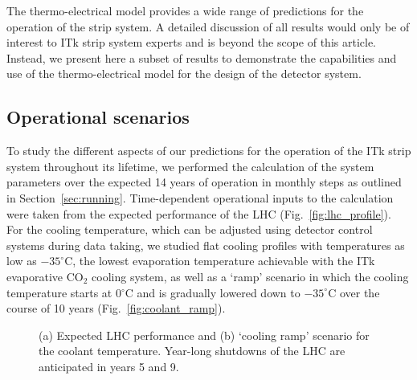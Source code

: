 
The thermo-electrical model provides a wide range of predictions for the operation of the strip system. A detailed discussion of all results would only be of interest to ITk strip system experts and is beyond the scope of this article. Instead, we present here a subset of results to demonstrate the capabilities and use of the thermo-electrical model for the design of the detector system.

\subsection{Operational scenarios}\label{sec:opscenarios}
To study the different aspects of our predictions for the operation of the ITk strip system throughout its lifetime, we performed the calculation of the system parameters over the expected 14 years of operation in monthly steps as outlined in Section~\ref{sec:running}. Time-dependent operational inputs to the calculation were taken from the expected performance of the LHC (Fig.~\ref{fig:lhc_profile}). For the cooling temperature, which can be adjusted using detector control systems during data taking, we studied flat cooling profiles with temperatures as low as $-35^\circ$C, the lowest evaporation temperature achievable with the ITk evaporative CO$_2$ cooling system, as well as a `ramp' scenario in which the cooling temperature starts at 0$^\circ$C and is gradually lowered down to $-35^\circ$C over the course of 10 years (Fig.~\ref{fig:coolant_ramp}).

\begin{figure}[ht]
\centering
{}\quad\quad
{}
\caption{(a) Expected LHC performance and (b) `cooling ramp' scenario for the coolant temperature. Year-long shutdowns of the LHC are anticipated in years 5 and 9.}
\label{fig:opscenarios}
\end{figure}

